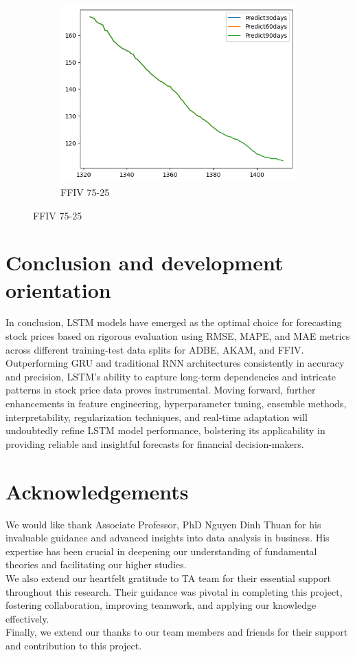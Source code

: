 \documentclass{ieeeojies}
\begin{document}
\begin{figure}[H]
\begin{subfigure}[b]{0.33\linewidth}
        \centering
        \includegraphics[width=\linewidth]{RNN Plot/RNN_FFIV_75_25_90.png}
        \caption{FFIV 75-25}
        \label{fig:ffiv-75-25}
    \end{subfigure}
\end{figure}
\section{Conclusion and development orientation}
In conclusion, LSTM models have emerged as the optimal choice for forecasting stock prices based on rigorous evaluation using RMSE, MAPE, and MAE metrics across different training-test data splits for ADBE, AKAM, and FFIV. Outperforming GRU and traditional RNN architectures consistently in accuracy and precision, LSTM's ability to capture long-term dependencies and intricate patterns in stock price data proves instrumental. Moving forward, further enhancements in feature engineering, hyperparameter tuning, ensemble methods, interpretability, regularization techniques, and real-time adaptation will undoubtedly refine LSTM model performance, bolstering its applicability in providing reliable and insightful forecasts for financial decision-makers.\\
\vspace{-10pt}
\section*{Acknowledgements}
We would like thank Associate Professor, PhD Nguyen Dinh Thuan for his invaluable guidance and advanced insights into data analysis in business. His expertise has been crucial in deepening our understanding of fundamental theories and facilitating our higher studies.\\
We also extend our heartfelt gratitude to TA team for their essential support throughout this research. Their guidance was pivotal in completing this project, fostering collaboration, improving teamwork, and applying our knowledge effectively.\\
Finally, we extend our thanks to our team members and friends for their support and contribution to this project.\\
\end{document}
